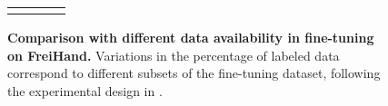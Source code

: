 \begin{figure}[t!]
\begin{minipage}[t]{0.56\textwidth}
{\begin{tabular}{cc|cc}
     \Xhline{1.0pt}
   \end{tabular}
}
\vspace{-10pt}
\label{tab:exp_PT_scale}
\end{minipage}
\hfill
\begin{minipage}[t]{0.42\textwidth}
\centering
\vspace{-3cm}
\vspace{-6pt}
\caption{\textbf{Comparison with different data availability in fine-tuning on FreiHand.} Variations in the percentage of labeled data correspond to different subsets of the fine-tuning dataset, following the experimental design in \citep{spurr:iccv21}.}
\vspace{-5pt}
\label{fig:fig_FT_scale}
\end{minipage}
\end{figure}